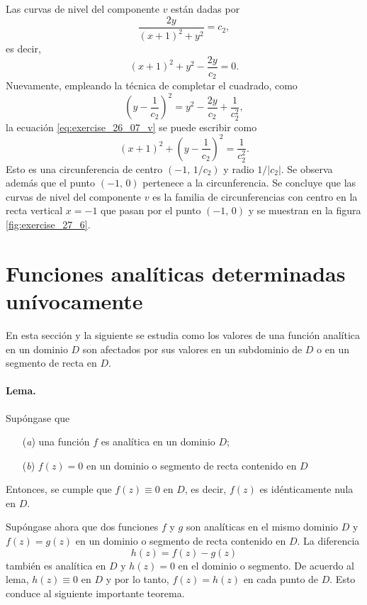 \documentclass[a4paper]{report}
\begin{document}
Las curvas de nivel del componente \(v\) están dadas por 
\[
 \frac{2y}{(x+1)^2+y^2}=c_2,
\]
es decir,
\begin{equation}\label{eq:exercise_26_07_v}
 (x+1)^2+y^2-\frac{2y}{c_2}=0.
\end{equation}
Nuevamente, empleando la técnica de completar el cuadrado, como
\[
 \left(y-\frac{1}{c_2}\right)^2=y^2-\frac{2y}{c_2}+\frac{1}{c_2^2},
\]
la ecuación \ref{eq:exercise_26_07_v} se puede escribir como
\[
 (x+1)^2+\left(y-\frac{1}{c_2}\right)^2=\frac{1}{c_2^2}.
\]
Esto es una circunferencia de centro \((-1,\,1/c_2)\) y radio \(1/|c_2|\). Se observa además que el punto \((-1,\,0)\) pertenece a la circunferencia. Se concluye que las curvas de nivel del componente \(v\) es la familia de circunferencias con centro en la recta vertical \(x=-1\) que pasan por el punto \((-1,\,0)\) y se muestran en la figura \ref{fig:exercise_27_6}.

\section{Funciones analíticas determinadas unívocamente}\label{sec:uniquely_determined_analytic_functions}

En esta sección y la siguiente se estudia como los valores de una función analítica en un dominio \(D\) son afectados por sus valores en un subdominio de \(D\) o en un segmento de recta en \(D\). 

\paragraph{Lema.} Supóngase que 
\begin{enumerate}
 \item[(\textit{a})] una función \(f\) es analítica en un dominio \(D\);
 \item[(\textit{b})] \(f(z)=0\) en un dominio o segmento de recta contenido en \(D\)
\end{enumerate}
Entonces, se cumple que \(f(z)\equiv0\) en \(D\), es decir, \(f(z)\) es idénticamente nula en \(D\).

Supóngase ahora que dos funciones \(f\) y \(g\) son analíticas en el mismo dominio \(D\) y \(f(z)=g(z)\) en un dominio o segmento de recta contenido en \(D\). La diferencia
\[
 h(z)=f(z)-g(z)
\]
también es analítica en \(D\) y \(h(z)=0\) en el dominio o segmento. De acuerdo al lema, \(h(z)\equiv0\) en \(D\) y por lo tanto, \(f(z)=h(z)\) en cada punto de \(D\). Esto conduce al siguiente importante teorema.
\end{document}
